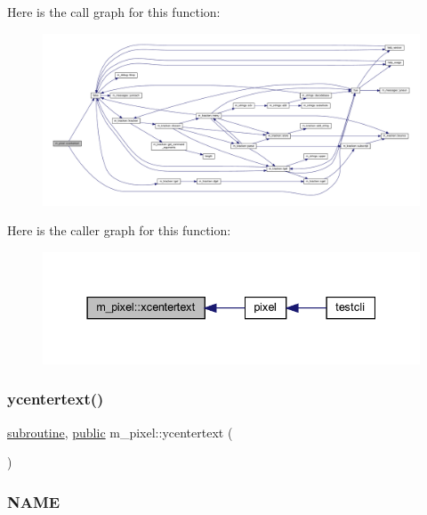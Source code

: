 Here is the call graph for this function\+:
\nopagebreak
\begin{figure}[H]
\begin{center}
\leavevmode
\includegraphics[width=350pt]{namespacem__pixel_a1e0c43d36b35eafea921f91c31d8a478_cgraph}
\end{center}
\end{figure}
Here is the caller graph for this function\+:
\nopagebreak
\begin{figure}[H]
\begin{center}
\leavevmode
\includegraphics[width=337pt]{namespacem__pixel_a1e0c43d36b35eafea921f91c31d8a478_icgraph}
\end{center}
\end{figure}
\mbox{\label{namespacem__pixel_a2e32105b5e77abf38768fec6b11376a3}} 
\subsubsection{\texorpdfstring{ycentertext()}{ycentertext()}}
{\footnotesize\ttfamily \hyperlink{M__stopwatch_83_8txt_acfbcff50169d691ff02d4a123ed70482}{subroutine}, \hyperlink{M__stopwatch_83_8txt_a2f74811300c361e53b430611a7d1769f}{public} m\+\_\+pixel\+::ycentertext (\begin{DoxyParamCaption}{ }\end{DoxyParamCaption})}



\subsubsection*{N\+A\+ME}

